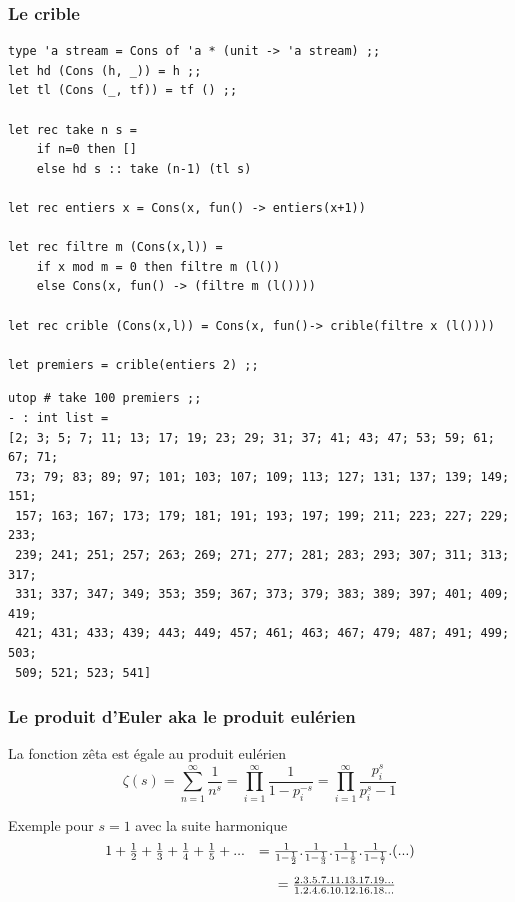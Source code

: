 \subsubsection{Le crible}
\begin{verbatim}
type 'a stream = Cons of 'a * (unit -> 'a stream) ;;
let hd (Cons (h, _)) = h ;;
let tl (Cons (_, tf)) = tf () ;;

let rec take n s =
	if n=0 then []
	else hd s :: take (n-1) (tl s) 

let rec entiers x = Cons(x, fun() -> entiers(x+1)) 

let rec filtre m (Cons(x,l)) =
	if x mod m = 0 then filtre m (l()) 
	else Cons(x, fun() -> (filtre m (l()))) 

let rec crible (Cons(x,l)) = Cons(x, fun()-> crible(filtre x (l())))

let premiers = crible(entiers 2) ;;
\end{verbatim}
\begin{verbatim}
utop # take 100 premiers ;;
- : int list =
[2; 3; 5; 7; 11; 13; 17; 19; 23; 29; 31; 37; 41; 43; 47; 53; 59; 61; 67; 71;
 73; 79; 83; 89; 97; 101; 103; 107; 109; 113; 127; 131; 137; 139; 149; 151;
 157; 163; 167; 173; 179; 181; 191; 193; 197; 199; 211; 223; 227; 229; 233;
 239; 241; 251; 257; 263; 269; 271; 277; 281; 283; 293; 307; 311; 313; 317;
 331; 337; 347; 349; 353; 359; 367; 373; 379; 383; 389; 397; 401; 409; 419;
 421; 431; 433; 439; 443; 449; 457; 461; 463; 467; 479; 487; 491; 499; 503;
 509; 521; 523; 541]
\end{verbatim}

\subsubsection{Le produit d'Euler aka le produit eulérien}
La fonction zêta est égale au produit eulérien
\[ \zeta(s) = \sum_{n=1}^{\infty} \frac{1}{n^s} = \prod_{i=1}^\infty \frac{1}{1-p_i^{-s}} = \prod_{i=1}^\infty \frac{p_i^s}{p_i^s-1} \]

Exemple pour $s=1$ avec la suite harmonique
$$
\begin{array}{ccc}
1+ \frac{1}{2} + \frac{1}{3} + \frac{1}{4} + \frac{1}{5} +...  &=  \frac{1}{1-\frac{1}{2}} .\frac{1}{1-\frac{1}{3}}.\frac{1}{1-\frac{1}{5}}.\frac{1}{1-\frac{1}{7}}. (...) \\[\bigskipamount]
&= \frac{2.3.5.7.11.13.17.19...}{1.2.4.6.10.12.16.18...} 
\end{array}
$$

